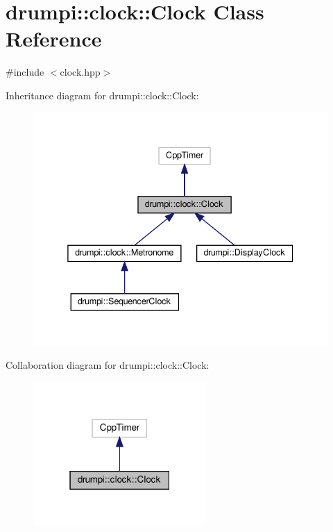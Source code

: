 \hypertarget{classdrumpi_1_1clock_1_1Clock}{}\section{drumpi\+:\+:clock\+:\+:Clock Class Reference}
\label{classdrumpi_1_1clock_1_1Clock}


{\ttfamily \#include $<$clock.\+hpp$>$}



Inheritance diagram for drumpi\+:\+:clock\+:\+:Clock\+:
\nopagebreak
\begin{figure}[H]
\begin{center}
\leavevmode
\includegraphics[width=338pt]{classdrumpi_1_1clock_1_1Clock__inherit__graph}
\end{center}
\end{figure}


Collaboration diagram for drumpi\+:\+:clock\+:\+:Clock\+:
\nopagebreak
\begin{figure}[H]
\begin{center}
\leavevmode
\includegraphics[width=187pt]{classdrumpi_1_1clock_1_1Clock__coll__graph}
\end{center}
\end{figure}
